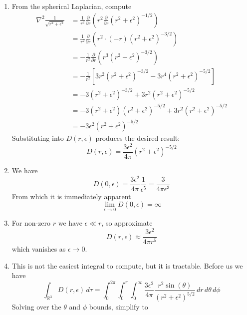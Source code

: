 \documentclass[a4paper]{article}
\begin{document}
\begin{enumerate}[label=(\alph*)]
	\item From the spherical Laplacian, compute
	\begin{align*}
		\nabla^{2}\frac{1}{\sqrt{r^{2} + \epsilon^{2}}} & = \frac{1}{r^{2}}\frac{\partial }{\partial r}\!\left( r^{2}\frac{\partial }{\partial r}\!\left( r^{2} + \epsilon^{2} \right)^{-1/2} \right) \\
		 & = \frac{1}{r^{2}}\frac{\partial }{\partial r}\!\left( r^{2} \cdot \!\left( -r \right)\!\left( r^{2} + \epsilon^{2} \right)^{-3 / 2} \right) \\ 
		 & = -\frac{1}{r^{2}}\frac{\partial }{\partial r}\!\left( r^{3}\!\left( r^{2} + \epsilon^{2} \right)^{-3 / 2} \right) \\
		 & = -\frac{1}{r^{2}}\!\left[ 3r^{2}\!\left( r^{2} + \epsilon^{2} \right)^{-3/2} - 3r^{4}\!\left( r^{2} + \epsilon^{2} \right)^{-5/2} \right] \\
		 & = -3 \!\left( r^{2} + \epsilon^{2} \right)^{-3/2} + 3r^{2}\!\left( r^{2} + \epsilon^{2} \right)^{-5/2} \\
		 & = -3 \!\left( r^{2} + \epsilon^{2} \right)\!\left( r^{2} + \epsilon^{2} \right)^{-5/2} + 3r^{2}\!\left( r^{2} + \epsilon^{2} \right)^{-5/2} \\
		 & = -3 \epsilon^{2}\!\left( r^{2} + \epsilon^{2} \right)^{-5/2}
	\end{align*}
	Substituting into \( D \!\left( r,\epsilon \right) \) produces the desired result:
	\[
		D \!\left( r,\epsilon \right) = \frac{3 \epsilon^{2}}{4 \pi}\!\left( r^{2} + \epsilon^{2} \right)^{-5/2} 
	\]
	\item We have
	\[
		D \!\left( 0,\epsilon \right) = \frac{3 \epsilon^{2}}{4 \pi}\frac{1}{\epsilon^{5}} = \frac{3}{4 \pi \epsilon^{3}} 
	\]
	From which it is immediately apparent
	\[
		\lim\limits_{\epsilon \to 0} D \!\left( 0,\epsilon \right) = \infty 
	\]
	\item For non-zero \( r \) we have \( \epsilon \ll r \), so approximate
	\[
		D \!\left( r,\epsilon \right) \approx \frac{3 \epsilon^{2}}{4 \pi r^{5}} 
	\]
	which vanishes as \( \epsilon \rightarrow 0 \).
	\item This is not the easiest integral to compute, but it is tractable. Before us we have
	\[
		\int_{\mathbb{R}^{3}} D \!\left( r,\epsilon \right) \, d \tau = \int^{2 \pi}_{0} \int^{\pi}_{0} \int^{\infty}_{0} \frac{3 \epsilon^{2}}{4 \pi}\frac{r^{2}\sin\!\left(\theta\right)}{\!\left( r^{2} + \epsilon^{2} \right)^{5/2}} \, dr \, d \theta \, d \phi
	\]
	Solving over the \( \theta \) and \( \phi \) bounds, simplify to

\end{enumerate}
\end{document}
